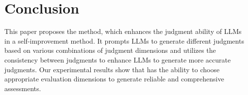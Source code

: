 \section{Conclusion}
This paper proposes the \method{} method, which enhances the judgment ability of LLMs in a self-improvement method. It prompts LLMs to generate different judgments based on various combinations of judgment dimensions and utilizes the consistency between judgments to enhance LLMs to generate more accurate judgments. Our experimental results show that \method{} has the ability to choose appropriate evaluation dimensions to generate reliable and comprehensive assessments.